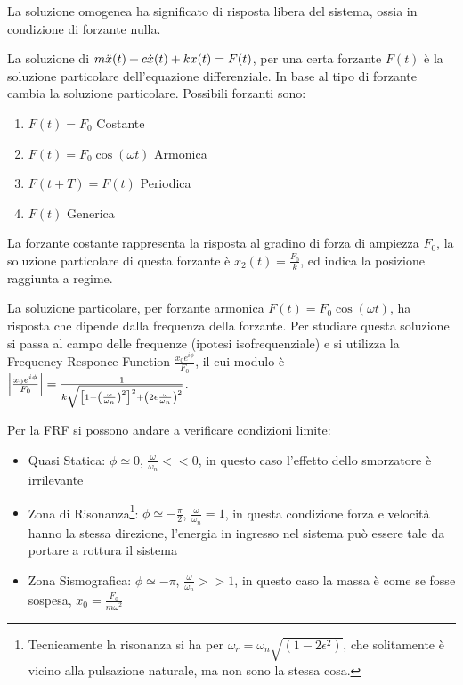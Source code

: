 La soluzione omogenea ha significato di risposta libera del sistema, ossia in condizione di forzante nulla.

La soluzione di \(m\Ddot{x}(t) + c\dot{x}(t) + k x(t) = F(t)\), per una certa forzante \(F(t)\) è la soluzione particolare  dell'equazione differenziale.
In base al tipo di forzante cambia la soluzione particolare.
Possibili forzanti sono:
\begin{enumerate}
    \item \(F(t) = F_0\) Costante
    \item \(F(t) = F_0 \cos{(\omega t)}\) Armonica
    \item \(F(t+T) = F(t) \) Periodica
    \item \(F(t)\) Generica
\end{enumerate}

La forzante costante rappresenta la risposta al gradino di forza di ampiezza \(F_0\), la soluzione particolare di questa forzante è \(x_2(t) = \frac{F_0}{k}\), ed indica la posizione raggiunta a regime.

La soluzione particolare, per forzante armonica \(F(t) = F_0 \cos{(\omega t)}\), ha risposta che dipende dalla frequenza della forzante.
Per studiare questa soluzione si passa al campo delle frequenze (ipotesi isofrequenziale) e si utilizza la Frequency Responce Function \( \frac{x_0 e^{i\phi}}{F_0} \), il cui modulo è \( \left|\frac{x_0 e^{i\phi}}{F_0}\right| = \frac{1}{k\sqrt{\left[1-\left(\frac{\omega}{\omega_n}\right)^2\right]^2+\left(2\epsilon \frac{\omega}{\omega_n}\right)^2}} \).

Per la FRF si possono andare a verificare condizioni limite:
\begin{itemize}
    \item Quasi Statica: \(\phi\simeq 0\), \(\frac{\omega}{\omega_n} << 0\), in questo caso l'effetto dello smorzatore è irrilevante
    \item Zona di Risonanza\footnote{Tecnicamente la risonanza si ha per \(\omega_r=\omega_n\sqrt{(1-2\epsilon^2)}\), che solitamente è vicino alla pulsazione naturale, ma non sono la stessa cosa.}: \(\phi\simeq -\frac{\pi}{2}\), \(\frac{\omega}{\omega_n} = 1\), in questa condizione forza e velocità hanno la stessa direzione, l'energia in ingresso nel sistema può essere tale da portare a rottura il sistema
    \item Zona Sismografica: \(\phi\simeq -\pi\), \(\frac{\omega}{\omega_n} >> 1\), in questo caso la massa è come se fosse sospesa, \( x_0 = \frac{F_0}{m \omega^2} \)
\end{itemize}

